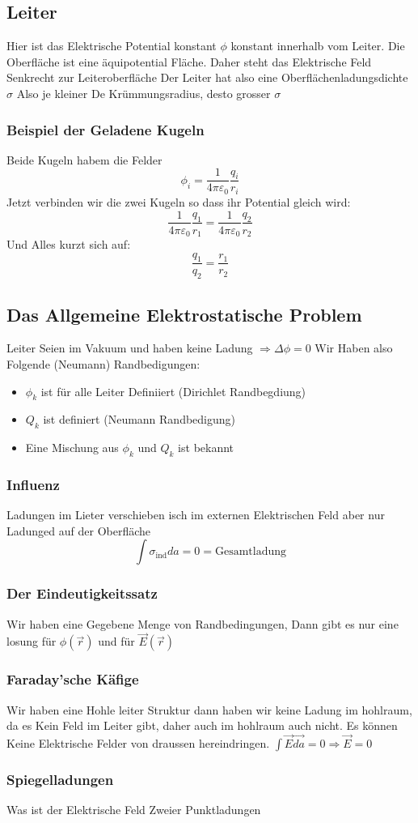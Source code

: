 \documentclass{article}
\begin{document}
\subsection{Leiter}Hier ist das Elektrische Potential konstant $\phi$ konstant innerhalb vom Leiter. Die Oberfläche ist eine äquipotential Fläche. Daher steht das Elektrische Feld Senkrecht zur Leiteroberfläche
Der Leiter hat also eine Oberflächenladungsdichte $\sigma$ Also je kleiner De Krümmungsradius, desto grosser $\sigma$
\subsubsection{Beispiel der Geladene Kugeln} Beide Kugeln habem die Felder \[\phi_i=\frac{1}{4\pi\varepsilon_0}\frac{q_i}{r_i}\] Jetzt verbinden wir die zwei Kugeln so dass ihr Potential gleich wird:
\[\frac{1}{4\pi\varepsilon_0}\frac{q_1}{r_1}=\frac{1}{4\pi\varepsilon_0}\frac{q_2}{r_2}\]Und Alles kurzt sich auf:\[\frac{q_1}{q_2}=\frac{r_1}{r_2}\]
\subsection{Das Allgemeine Elektrostatische Problem} Leiter Seien im Vakuum und haben keine Ladung $\Rightarrow \Delta\phi=0$ Wir Haben also Folgende (Neumann) Randbedigungen:\begin{itemize}
  \item{$\phi_k$ ist für alle Leiter Definiiert (Dirichlet Randbegdiung)}
  \item{$Q_k$ ist definiert (Neumann Randbedigung)}
  \item{Eine Mischung aus $\phi_k$ und $Q_k$ ist bekannt}
\end{itemize}
\subsubsection{Influenz} Ladungen im Lieter verschieben isch im externen Elektrischen Feld aber nur Ladunged auf der Oberfläche \[\int \sigma_\text{ind} da=0=\text{Gesamtladung}\]
\subsubsection{Der Eindeutigkeitssatz} Wir haben eine Gegebene Menge von Randbedingungen, Dann gibt es nur eine losung für $\phi(\vec{r})$ und für $\vec{E}(\vec{r})$
\subsubsection{Faraday'sche Käfige} Wir haben eine Hohle leiter Struktur dann haben wir keine Ladung im hohlraum, da es Kein Feld im Leiter gibt, daher auch im hohlraum auch nicht. Es können Keine Elektrische Felder von draussen hereindringen.
$\int \vec{E}\vec{da}=0\Rightarrow \vec{E}=0$
\subsubsection{Spiegelladungen} Was ist der Elektrische Feld Zweier Punktladungen
\end{document}
